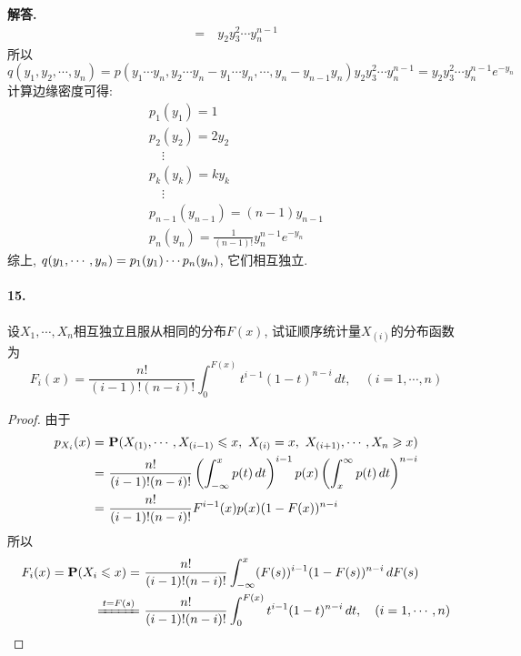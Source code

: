 \documentclass[12pt, a4paper, oneside]{ctexart}
\newenvironment{solution}{\par\noindent\textbf{解答. }}{\bigskip\par}
\begin{document}
\begin{solution}
\begin{align*}
        =&\ y_2y_3^2\cdots y_n^{n-1}
    \end{align*}
    所以
    \begin{equation*}
    q(y_1,y_2,\cdots,y_n) = p(y_1\cdots y_n,y_2\cdots y_n-y_1\cdots y_n,\cdots, y_n-y_{n-1}y_n)y_2y_3^2\cdots y_n^{n-1} = y_2y_3^2\cdots y_n^{n-1}e^{-y_n}
    \end{equation*}
    计算边缘密度可得: 
    \begin{equation*}
        \begin{array}{l}
            p_1(y_1) = 1\\ p_2(y_2) = 2y_2\\ \quad\vdots\\ p_{k}(y_k) = ky_k\\ \quad\vdots \\ p_{n-1}(y_{n-1})=(n-1)y_{n-1}\\ p_n(y_n)=\frac{1}{(n-1)!}y_n^{n-1}e^{-y_n}
        \end{array}
    \end{equation*}
    综上, $\displaystyle q(y_1,\cdots, y_n) = p_1(y_1)\cdots p_n(y_n)$, 它们相互独立.
\end{solution}
\paragraph{15.}设$X_1,\cdots,X_n$相互独立且服从相同的分布$F(x)$, 试证顺序统计量$X_{(i)}$的分布函数为
\begin{equation*}
    F_i(x) = \frac{n!}{(i-1)!(n-i)!}\int_0^{F(x)}t^{i-1}(1-t)^{n-i}\,dt,\quad (i=1,\cdots, n)
\end{equation*}
\begin{proof}
    由于
    \begin{align*}
        p_{X_i}(x) =&\ \P(X_{(1)},\cdots, X_{(i-1)}\leqslant x,\ X_{(i)}=x,\ X_{(i+1)},\cdots,X_n\geqslant x)\\
        =&\ \frac{n!}{(i-1)!(n-i)!}\left(\int_{-\infty}^xp(t)\,dt\right)^{i-1}p(x)\left(\int_{x}^{\infty}p(t)\,dt\right)^{n-i}\\
        =&\ \frac{n!}{(i-1)!(n-i)!}F^{i-1}(x)p(x)(1-F(x))^{n-i}
    \end{align*}
    所以
    \begin{align*}
        F_i(x) = \P(X_i\leqslant x) =&\ \frac{n!}{(i-1)!(n-i)!}\int_{-\infty}^x(F(s))^{i-1}(1-F(s))^{n-i}\,dF(s)\\
        \xlongequal{t=F(s)}&\ \frac{n!}{(i-1)!(n-i)!}\int_0^{F(x)}t^{i-1}(1-t)^{n-i}\,dt,\quad (i=1,\cdots, n)
    \end{align*}
\end{proof}
\end{document}
